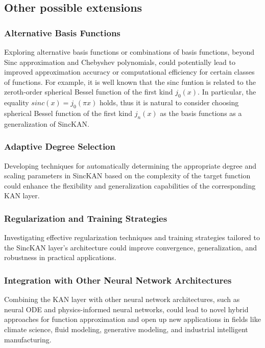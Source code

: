 \subsection{Other possible extensions}

\subsubsection*{Alternative Basis Functions}
Exploring alternative basis functions or combinations of basis functions, beyond Sinc approximation and Chebyshev polynomials, could potentially lead to improved approximation accuracy or computational efficiency for certain classes of functions. For example, it is well known that the sinc funtion is related to the zeroth-order spherical Bessel function of the first kind $j_{0}(x)$. In particular, the equality $sinc(x) = j_{0} (\pi x)$ holds, thus it is natural to consider choosing spherical Bessel function of the first kind $j_{n} (x)$ as the basis functions as a generalization of SincKAN.

\subsubsection*{Adaptive Degree Selection}
Developing techniques for automatically determining the appropriate degree and scaling parameters in SincKAN based on the complexity of the target function could enhance the flexibility and generalization capabilities of the corresponding KAN layer.

\subsubsection*{Regularization and Training Strategies}
Investigating effective regularization techniques and training strategies tailored to the SincKAN layer’s architecture could improve convergence, generalization, and robustness in practical applications.

\subsubsection*{Integration with Other Neural Network Architectures}

Combining the KAN layer with other neural network architectures, such as neural ODE and physics-informed neural networks, could lead to novel hybrid approaches for function approximation and open up new applications in fields like climate science, fluid modeling, generative modeling, and industrial intelligent manufacturing.

